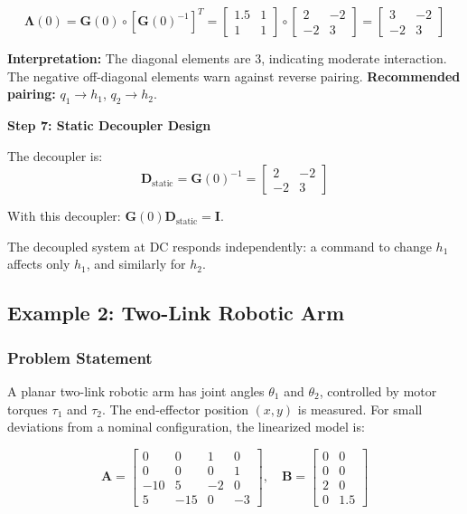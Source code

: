 \begin{equation}
\boldsymbol{\Lambda}(0) = \mathbf{G}(0) \circ [\mathbf{G}(0)^{-1}]^T = \begin{bmatrix} 1.5 & 1 \\ 1 & 1 \end{bmatrix} \circ \begin{bmatrix} 2 & -2 \\ -2 & 3 \end{bmatrix} = \begin{bmatrix} 3 & -2 \\ -2 & 3 \end{bmatrix}
\end{equation}

\textbf{Interpretation:} The diagonal elements are 3, indicating moderate interaction. The negative off-diagonal elements warn against reverse pairing. \textbf{Recommended pairing:} $q_1 \to h_1$, $q_2 \to h_2$.

\textbf{Step 7: Static Decoupler Design}

The decoupler is:
\begin{equation}
\mathbf{D}_{\text{static}} = \mathbf{G}(0)^{-1} = \begin{bmatrix} 2 & -2 \\ -2 & 3 \end{bmatrix}
\end{equation}

With this decoupler: $\mathbf{G}(0)\mathbf{D}_{\text{static}} = \mathbf{I}$.

The decoupled system at DC responds independently: a command to change $h_1$ affects only $h_1$, and similarly for $h_2$.


\subsection{Example 2: Two-Link Robotic Arm}

\subsubsection{Problem Statement}

A planar two-link robotic arm has joint angles $\theta_1$ and $\theta_2$, controlled by motor torques $\tau_1$ and $\tau_2$. The end-effector position $(x, y)$ is measured. For small deviations from a nominal configuration, the linearized model is:

\begin{equation}
\mathbf{A} = \begin{bmatrix} 0 & 0 & 1 & 0 \\ 0 & 0 & 0 & 1 \\ -10 & 5 & -2 & 0 \\ 5 & -15 & 0 & -3 \end{bmatrix}, \quad
\mathbf{B} = \begin{bmatrix} 0 & 0 \\ 0 & 0 \\ 2 & 0 \\ 0 & 1.5 \end{bmatrix}
\end{equation}

